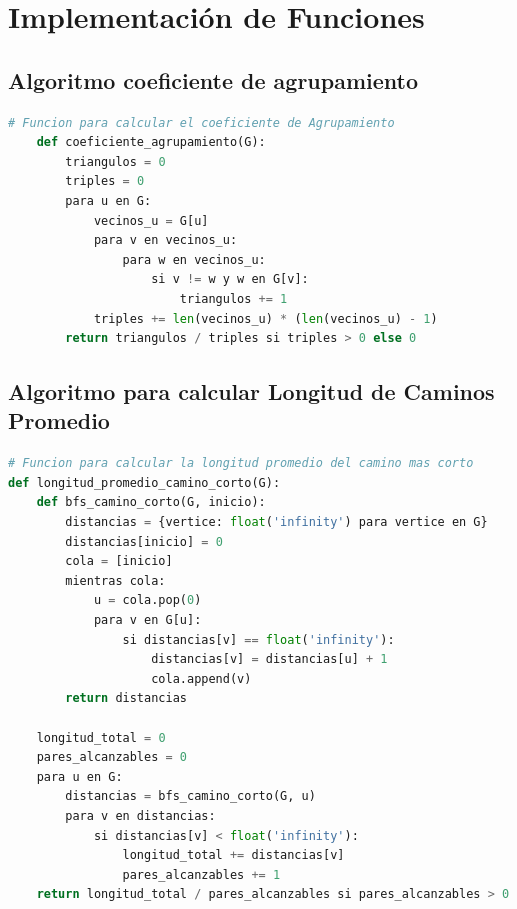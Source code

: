 \newpage
\section{Implementación de Funciones}

\subsection{Algoritmo coeficiente de agrupamiento}
\begin{lstlisting}[language=Python]
    # Funcion para calcular el coeficiente de Agrupamiento
    def coeficiente_agrupamiento(G):
        triangulos = 0
        triples = 0
        para u en G:
            vecinos_u = G[u]
            para v en vecinos_u:
                para w en vecinos_u:
                    si v != w y w en G[v]:
                        triangulos += 1
            triples += len(vecinos_u) * (len(vecinos_u) - 1)
        return triangulos / triples si triples > 0 else 0
\end{lstlisting}

\subsection{Algoritmo para calcular Longitud de Caminos Promedio}

\begin{lstlisting}[language=Python]
# Funcion para calcular la longitud promedio del camino mas corto
def longitud_promedio_camino_corto(G):
    def bfs_camino_corto(G, inicio):
        distancias = {vertice: float('infinity') para vertice en G}
        distancias[inicio] = 0
        cola = [inicio]
        mientras cola:
            u = cola.pop(0)
            para v en G[u]:
                si distancias[v] == float('infinity'):
                    distancias[v] = distancias[u] + 1
                    cola.append(v)
        return distancias

    longitud_total = 0
    pares_alcanzables = 0
    para u en G:
        distancias = bfs_camino_corto(G, u)
        para v en distancias:
            si distancias[v] < float('infinity'):
                longitud_total += distancias[v]
                pares_alcanzables += 1
    return longitud_total / pares_alcanzables si pares_alcanzables > 0 else float('infinity')
\end{lstlisting}


